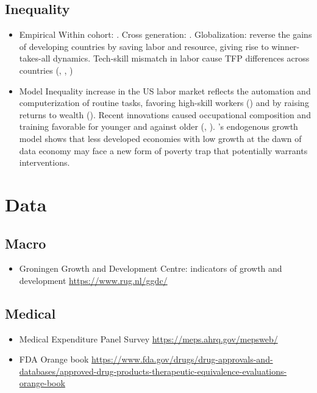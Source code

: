 \documentclass[10pt]{article} %
\begin{document}
    \subsection{Inequality}
    \begin{itemize}
        \item Empirical\newline
        Within cohort: \cite{AcemogluRestrepo2022}. Cross generation: \cite{AdaoBerajaPandalaiNayar2020}. Globalization: reverse the gains of developing countries by saving labor and resource, giving rise to winner-takes-all dynamics. Tech-skill mismatch in labor cause TFP differences across countries  (\cite{AcemogluZilibotti2001}, \cite{Zeira2006}, \cite{KorinekStiglitz2021})

        \item Model\newline
        Inequality increase in the US labor market reflects the automation and computerization of routine tasks, favoring high-skill workers (\cite{AutorLevyMurnane2003}) and by raising returns to wealth (\cite{MollRachelRestrepo2022}). Recent innovations caused occupational composition and training favorable for younger and against older (\cite{AdaoBerajaPandalaiNayar2020}, \cite{PrettnerStrulik2020}). \cite{CongLiZhang2021}’s endogenous growth model shows that less developed economies with low growth at the dawn of data economy may face a new form of poverty trap that potentially warrants interventions.
    \end{itemize}

\newpage
\section{Data}
    \subsection{Macro}
        \begin{itemize}
            \item Groningen Growth and Development Centre: indicators of growth and development \url{https://www.rug.nl/ggdc/}
        \end{itemize}

    \subsection{Medical}
        \begin{itemize}
            \item Medical Expenditure Panel Survey \url{https://meps.ahrq.gov/mepsweb/}
            \item FDA Orange book \url{https://www.fda.gov/drugs/drug-approvals-and-databases/approved-drug-products-therapeutic-equivalence-evaluations-orange-book}
        \end{itemize}
\end{document}
